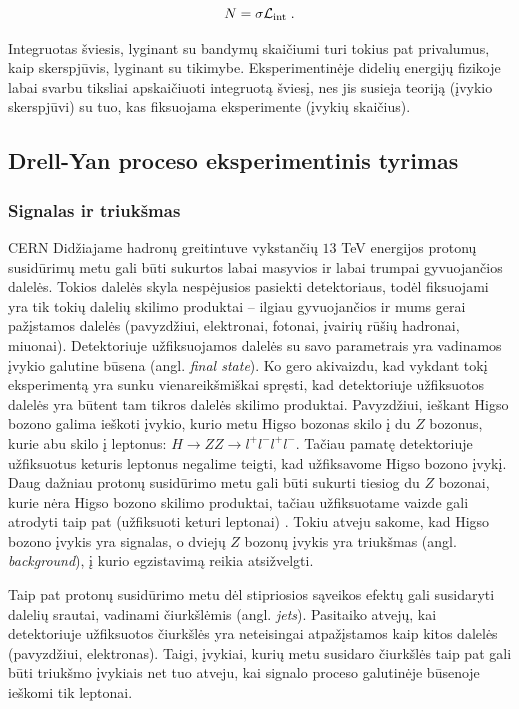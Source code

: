 \documentclass[a4paper, 12pt]{article}
\newcommand{\Lumi}{{\cal L}_\mathrm{int}}
\newlength\q
\begin{document}
\begin{equation}
	N=\sigma\Lumi \; .
\label{eq:evno}
\end{equation}

Integruotas šviesis, lyginant su bandymų skaičiumi turi tokius pat privalumus, kaip skerspjūvis,
lyginant su tikimybe.
Eksperimentinėje didelių energijų fizikoje labai svarbu tiksliai apskaičiuoti integruotą šviesį,
nes jis susieja teoriją (įvykio skerspjūvi) su tuo, kas fiksuojama eksperimente (įvykių skaičius).


\subsection{Drell-Yan proceso eksperimentinis tyrimas}

\subsubsection{Signalas ir triukšmas}

CERN Didžiajame hadronų greitintuve vykstančių $13$ TeV energijos protonų susidūrimų metu gali
būti sukurtos labai masyvios ir labai trumpai gyvuojančios dalelės.
Tokios dalelės skyla nespėjusios pasiekti detektoriaus, todėl fiksuojami yra tik tokių dalelių
skilimo produktai -- ilgiau gyvuojančios ir mums gerai pažįstamos dalelės (pavyzdžiui,
elektronai, fotonai, įvairių rūšių hadronai, miuonai).
Detektoriuje užfiksuojamos dalelės su savo parametrais yra vadinamos įvykio galutine būsena
(angl. \textit{final state}).
Ko gero akivaizdu, kad vykdant tokį eksperimentą yra sunku vienareikšmiškai spręsti, kad
detektoriuje užfiksuotos dalelės yra būtent tam tikros dalelės skilimo produktai.
Pavyzdžiui, ieškant Higso bozono galima ieškoti įvykio, kurio metu Higso bozonas skilo į du
$Z$ bozonus, kurie abu skilo į leptonus: $H \rightarrow ZZ \rightarrow l^{+}l^{-}l^{+}l^{-}$.
Tačiau pamatę detektoriuje užfiksuotus keturis leptonus negalime teigti, kad užfiksavome
Higso bozono įvykį.
Daug dažniau protonų susidūrimo metu gali būti sukurti tiesiog du $Z$ bozonai, kurie nėra
Higso bozono skilimo produktai, tačiau užfiksuotame vaizde gali atrodyti taip pat (užfiksuoti
keturi leptonai) \cite{HiggsEX}.
Tokiu atveju sakome, kad Higso bozono įvykis yra signalas, o dviejų $Z$ bozonų įvykis yra
triukšmas (angl. \textit{background}), į kurio egzistavimą reikia atsižvelgti.

Taip pat protonų susidūrimo metu dėl stipriosios sąveikos efektų gali susidaryti dalelių
srautai, vadinami čiurkšlėmis (angl. \textit{jets}).
Pasitaiko atvejų, kai detektoriuje užfiksuotos čiurkšlės yra neteisingai atpažįstamos kaip
kitos dalelės (pavyzdžiui, elektronas).
Taigi, įvykiai, kurių metu susidaro čiurkšlės taip pat gali būti triukšmo įvykiais net tuo
atveju, kai signalo proceso galutinėje būsenoje ieškomi tik leptonai.
\end{document}
